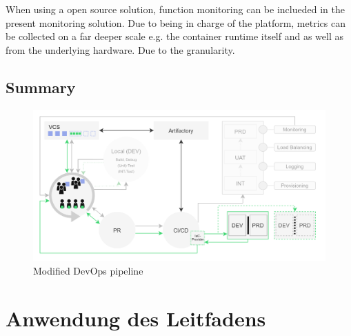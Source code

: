\documentclass[11pt]{article}
\begin{document}
When using a open source solution, function monitoring can be inclueded in the present monitoring solution. Due to being in charge of the platform, metrics can be collected on a far deeper scale e.g. the container runtime itself and as well as from the underlying hardware. Due to the granularity.
\subsection{Summary}
\begin{figure}[H]
\caption{Modified DevOps pipeline}
\label{fig:devopsModified}
\centering
\includegraphics[width=1\textwidth]{DevOps modified}
\end{figure}
\newpage
\section{Anwendung des Leitfadens}
\end{document}
